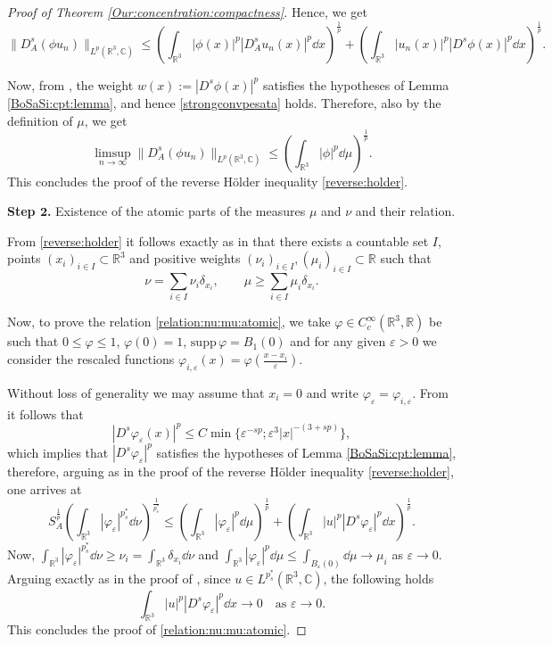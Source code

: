 \documentclass[leqno,11pt]{amsart}
\newcommand{\R}{\mathbb R}
\newcommand{\CC}{\mathbb C}
\newcommand{\C}{\mathbb C}
\newcommand{\ve}{\varepsilon}
\newcommand{\eps}{\varepsilon}
\newcommand{\supp}{\mathrm{supp}\,}
\numberwithin{equation}{section}
\begin{document}
\begin{proof}[Proof of Theorem \ref{Our:concentration:compactness}]
Hence, we get
$$
    \|D^s_A(\phi u_n)\|_{L^p(\R^3,\C)} \leq \left(\int_{\R^3} |\phi(x)|^p|D^s_A u_n(x)|^p\dd x\right)^{\frac1p}+\left(\int_{\R^3} |u_n(x)|^p |D^s \phi(x)|^p\dd x\right)^{\frac1p}.
$$

Now, from \cite[Lemma 2.2]{BonderSaintierSilva}, the weight $w(x) := |D^s\phi(x)|^p$ satisfies the hypotheses of Lemma \ref{BoSaSi:cpt:lemma}, and hence \eqref{strongconvpesata} holds.
Therefore, also by the definition of $\mu$, we get
$$
    \limsup_{n\to\infty} \|D^s_A(\phi u_n)\|_{L^p(\R^3,\C)}\le \left(\int_{\R^3} |\phi|^p\dd\mu\right)^{\frac1p}.
$$
This concludes the proof of the reverse H\"older inequality \eqref{reverse:holder}.



{\bf Step $\mathbf{2}$.} Existence of the atomic parts of the measures $\mu$ and $\nu$ and their relation.

From \eqref{reverse:holder} it follows exactly as in \cite[Lemma 1.2]{Lions1985} that there exists a countable set $I$, points $(x_i)_{i\in I}\subset \R^3$ and positive weights $(\nu_i)_{i\in I}, (\mu_i)_{i\in I} \subset \R$ such that
$$
    \nu = \sum_{i\in I} \nu_i \delta_{x_i},\qquad \mu\ge \sum_{i\in I} \mu_i \delta_{x_i}.
$$




Now, to prove the relation \eqref{relation:nu:mu:atomic},
we take $\varphi\in C^\infty_c(\R^3,\R)$ be such that $0\le \varphi\le 1$, $\varphi(0)=1$, $\supp\varphi = B_1(0)$ and for any given $\ve>0$ we consider the rescaled functions $\varphi_{i,\ve}(x) = \varphi(\frac{x-x_i}{\ve})$.

Without loss of generality we may assume that $x_i=0$ and write $\varphi_\eps=\varphi_{i,\ve}$. From \cite[Corollary 2.3]{BonderSaintierSilva} it follows that
\begin{equation}\label{exact:decay}
|D^s \varphi_\ve(x)|^p \le C \min\{\ve^{-sp}; \ve^3 |x|^{-(3+sp)}\},
\end{equation}
which implies that $|D^s\varphi_\ve|^p$ satisfies the hypotheses of Lemma \ref{BoSaSi:cpt:lemma}, therefore, arguing as in the proof of the reverse H\"older inequality \eqref{reverse:holder}, one arrives at
$$
    S_A^\frac1p\left(\int_{\R^3} |\varphi_\ve|^{p^*_s}\dd\nu\right)^\frac{1}{p^*_s} \le \left(\int_{\R^3} |\varphi_\ve|^p\dd\mu\right)^\frac1p + \left(\int_{\R^3} |u|^p |D^s\varphi_\ve|^p\dd x\right)^\frac1p.
$$
Now, $\int_{\R^3} |\varphi_\ve|^{p^*_s}\dd\nu\ge \nu_i=\int_{\R^3}\delta_{x_i} \dd \nu$ and $\int_{\R^3} |\varphi_\ve|^p\dd\mu\le\int_{B_\ve(0)} \dd\mu \to \mu_i$  as $\ve\to 0$. Arguing exactly as in the proof of \cite[Theorem 1.1]{BonderSaintierSilva}, since $u\in L^{p^*_s}(\R^3,\CC)$, the following holds
\begin{equation}
\int_{\R^3} |u|^p |D^s\varphi_\ve|^p\dd x\to 0\quad \text{as } \ve\to 0.
\end{equation}
This concludes the proof of \eqref{relation:nu:mu:atomic}.



\end{proof}
\end{document}
